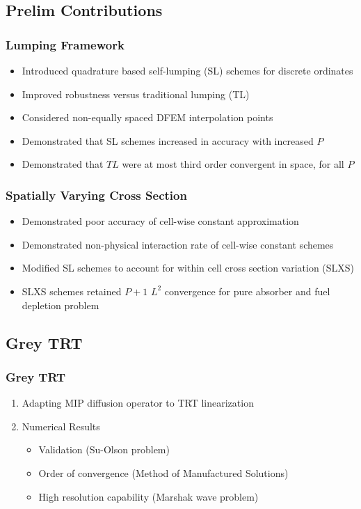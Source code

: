 \documentclass{beamer}
\begin{document}
\subsection{Prelim Contributions}
\begin{frame}
\frametitle{Lumping Framework}
\begin{itemize}
\item Introduced quadrature based self-lumping (SL) schemes for discrete ordinates
\item Improved robustness versus traditional lumping (TL)
\item Considered non-equally spaced DFEM interpolation points
\item Demonstrated that SL schemes increased in accuracy with increased $P$
\item Demonstrated that $TL$ were at most third order convergent in space, for all $P$
\end{itemize}
\end{frame}
%
\begin{frame}
\frametitle{Spatially Varying Cross Section}
%
\begin{itemize}
\item Demonstrated poor accuracy of cell-wise constant approximation
\item Demonstrated non-physical interaction rate of cell-wise constant schemes
\item Modified SL schemes to account for within cell cross section variation (SLXS)
\item SLXS schemes retained $P+1$ $L^2$ convergence for pure absorber and fuel depletion problem
\end{itemize}

\end{frame}



\subsection{Grey TRT}
\begin{frame}
\frametitle{Grey TRT}
\begin{enumerate}
\item Adapting MIP diffusion operator to TRT linearization
\item Numerical Results
\begin{itemize}
\item Validation (Su-Olson problem)
\item Order of convergence (Method of Manufactured Solutions)
\item High resolution capability (Marshak wave problem)
\end{itemize}
\end{enumerate}
\end{frame}
\end{document}
